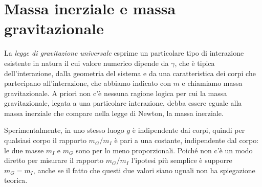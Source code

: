 \documentclass[class=book, crop=false, oneside, 12pt]{standalone}
\begin{document}
\section{Massa inerziale e massa gravitazionale}

La \emph{legge di gravitazione universale} esprime un particolare tipo di interazione esistente in natura il cui valore numerico dipende da \(\gamma\), che è tipica dell'interazione, dalla geometria del sistema e da una caratteristica dei corpi che partecipano all'interazione, che abbiamo indicato con \(m\) e chiamiamo massa gravitazionale. 
A priori non c'è nessuna ragione logica per cui la massa gravitazionale, legata a una particolare interazione, debba essere eguale alla massa inerziale che compare nella legge di Newton, la massa inerziale.

Sperimentalmente, in uno stesso luogo \(g\) è indipendente dai corpi, quindi per qualsiasi corpo il rapporto \(m_G / m_I\) è pari a una costante, indipendente dal corpo: 
le due masse \(m_I\) e \(m_G\) sono per lo meno proporzionali.
Poiché non c'è un modo diretto per misurare il rapporto \(m_G / m_I\) l'ipotesi più semplice è supporre \(m_G = m_I\), anche se il fatto che questi due valori siano uguali non ha spiegazione teorica.
\end{document}
